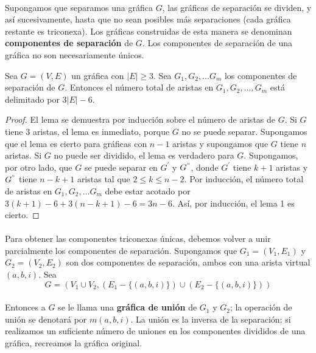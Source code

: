 \paragraph{}
Supongamos que separamos una gráfica $G$, las gráficas de separación se dividen, y así sucesivamente, hasta que no sean posibles más separaciones (cada gráfica restante es triconexa). Los gráficas construidas de esta manera se denominan \textbf{componentes de separación} de $G$. Los componentes de separación de una gráfica no son necesariamente únicos.
\begin{lemma}
Sea $G = \left(V, E \right)$ un gráfica con $\left| E \right| \geq 3$. Sea $G_{1}, G_{2}, \ldots G_{m}$ los componentes de separación de $G$. Entonces el número total de aristas en $G_{1}, G_{2}, \ldots , G_{m}$ está delimitado por $3\left| E \right| - 6$.
\label{lema:3.1}
\end{lemma}

\begin{proof}
 El lema se demuestra por inducción sobre el número de aristas de $G$. Si $G$ tiene $3$ aristas, el lema es inmediato, porque $G$ no se puede separar. Supongamos que el lema es cierto para gráficas con $n-1$ aristas y supongamos que $G$ tiene $n$ aristas. Si $G$ no puede ser dividido, el lema es verdadero para $G$. Supongamos, por otro lado, que $G$ se puede separar en $G^{'}$ y $G^{"}$, donde $G^{'}$ tiene $k + 1$ aristas y $G^{"}$ tiene $n - k + 1$ aristas tal que $2 \leq k \leq n - 2$. Por inducción, el número total de aristas en $G_{1}, G_{2}, \ldots G_{m}$ debe estar acotado por $3\left(k + 1\right) - 6 + 3\left(n - k + 1\right) - 6 = 3n - 6$. Así, por inducción, el lema 1 es cierto.
\end{proof}

\paragraph{}
Para obtener las componentes triconexas únicas, debemos volver a unir parcialmente los componentes de separación. Supongamos que $G_{1} = (V_{1},E_{1})$ y $G_{2}=(V_{2},E_{2})$ son dos componentes de separación, ambos con una arista virtual $\left(a, b, i\right)$. Sea
\begin{equation*}
G = \left(V_{1} \cup V_{2}, \left( E_{1} - \{\left(a, b, i\right)\}\right) \cup \left( E_{2} - \{\left(a, b, i\right)\}\right) \right)
\end{equation*}

\paragraph{}
Entonces a $G$ se le llama una \textbf{gráfica de unión} de $G_{1}$ y $G_{2}$; la operación de unión se denotará por $m\left(a, b, i \right)$. La unión es la inversa de la separación; si realizamos un suficiente número de uniones en los componentes divididos de una gráfica, recreamos la gráfica original.

